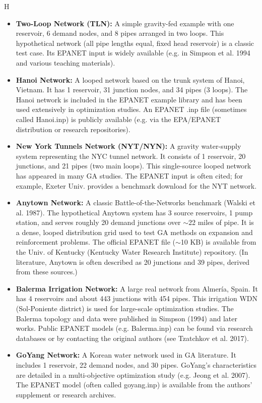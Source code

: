 H\documentclass[12pt, a4paper]{article}
\begin{document}
\begin{itemize}
    \item \textbf{Two-Loop Network (TLN):} A simple gravity-fed example with one reservoir, 6 demand nodes, and 8 pipes arranged in two loops\cite{ref18}. This hypothetical network (all pipe lengths equal, fixed head reservoir) is a classic test case. Its EPANET input is widely available (e.g. in Simpson et al. 1994 and various teaching materials).
    \item \textbf{Hanoi Network:} A looped network based on the trunk system of Hanoi, Vietnam. It has 1 reservoir, 31 junction nodes, and 34 pipes (3 loops)\cite{ref19}. The Hanoi network is included in the EPANET example library and has been used extensively in optimization studies\cite{ref19}. An EPANET .inp file (sometimes called Hanoi.inp) is publicly available (e.g. via the EPA/EPANET distribution or research repositories).
    \item \textbf{New York Tunnels Network (NYT/NYN):} A gravity water-supply system representing the NYC tunnel network. It consists of 1 reservoir, 20 junctions, and 21 pipes (two main loops)\cite{ref19}. This single-source looped network has appeared in many GA studies. The EPANET input is often cited; for example, Exeter Univ. provides a benchmark download for the NYT network\cite{ref19}.
    \item \textbf{Anytown Network:} A classic Battle-of-the-Networks benchmark (Walski et al. 1987). The hypothetical Anytown system has 3 source reservoirs, 1 pump station, and serves roughly 20 demand junctions over $\sim$22 miles of pipe\cite{ref20}. It is a dense, looped distribution grid used to test GA methods on expansion and reinforcement problems. The official EPANET file ($\sim$10 KB) is available from the Univ. of Kentucky (Kentucky Water Research Institute) repository\cite{ref20}. (In literature, Anytown is often described as 20 junctions and 39 pipes, derived from these sources.)
    \item \textbf{Balerma Irrigation Network:} A large real network from Almería, Spain. It has 4 reservoirs and about 443 junctions with 454 pipes\cite{ref21}. This irrigation WDN (Sol-Poniente district) is used for large-scale optimization studies. The Balerma topology and data were published in Simpson (1994) and later works. Public EPANET models (e.g. Balerma.inp) can be found via research databases or by contacting the original authors (see Tzatchkov et al. 2017).
    \item \textbf{GoYang Network:} A Korean water network used in GA literature. It includes 1 reservoir, 22 demand nodes, and 30 pipes\cite{ref18}. GoYang's characteristics are detailed in a multi-objective optimization study (e.g. Jeong et al. 2007). The EPANET model (often called goyang.inp) is available from the authors' supplement or research archives.

\end{itemize}
\end{document}
